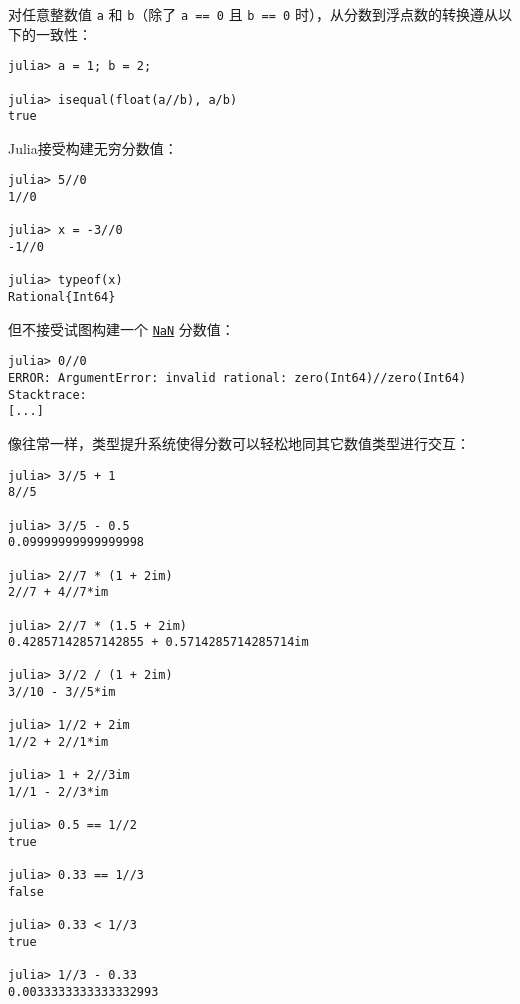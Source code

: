 对任意整数值 \texttt{a} 和 \texttt{b}（除了 \texttt{a == 0} 且 \texttt{b == 0} 时），从分数到浮点数的转换遵从以下的一致性：




\begin{verbatim}
julia> a = 1; b = 2;

julia> isequal(float(a//b), a/b)
true
\end{verbatim}



Julia接受构建无穷分数值：




\begin{verbatim}
julia> 5//0
1//0

julia> x = -3//0
-1//0

julia> typeof(x)
Rational{Int64}
\end{verbatim}



但不接受试图构建一个 \hyperlink{11449618129446476597}{\texttt{NaN}} 分数值：




\begin{verbatim}
julia> 0//0
ERROR: ArgumentError: invalid rational: zero(Int64)//zero(Int64)
Stacktrace:
[...]
\end{verbatim}



像往常一样，类型提升系统使得分数可以轻松地同其它数值类型进行交互：




\begin{verbatim}
julia> 3//5 + 1
8//5

julia> 3//5 - 0.5
0.09999999999999998

julia> 2//7 * (1 + 2im)
2//7 + 4//7*im

julia> 2//7 * (1.5 + 2im)
0.42857142857142855 + 0.5714285714285714im

julia> 3//2 / (1 + 2im)
3//10 - 3//5*im

julia> 1//2 + 2im
1//2 + 2//1*im

julia> 1 + 2//3im
1//1 - 2//3*im

julia> 0.5 == 1//2
true

julia> 0.33 == 1//3
false

julia> 0.33 < 1//3
true

julia> 1//3 - 0.33
0.0033333333333332993
\end{verbatim}



\hypertarget{3772396547767597421}{}


